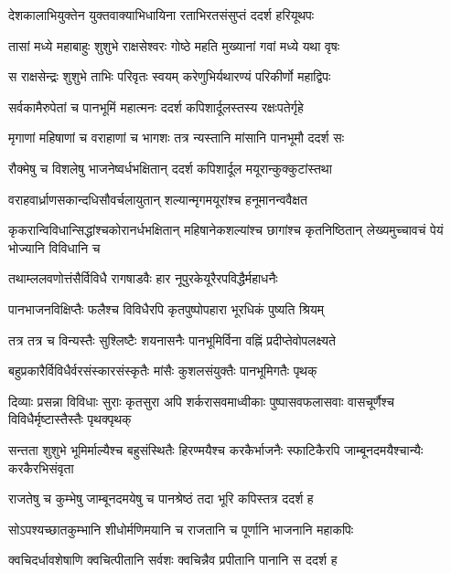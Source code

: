 \twolineshloka
{देशकालाभियुक्तेन युक्तवाक्याभिधायिना}
{रताभिरतसंसुप्तं ददर्श हरियूथपः} %

\twolineshloka
{तासां मध्ये महाबाहुः शुशुभे राक्षसेश्वरः}
{गोष्ठे महति मुख्यानां गवां मध्ये यथा वृषः} %

\twolineshloka
{स राक्षसेन्द्रः शुशुभे ताभिः परिवृतः स्वयम्}
{करेणुभिर्यथारण्यं परिकीर्णो महाद्विपः} %

\twolineshloka
{सर्वकामैरुपेतां च पानभूमिं महात्मनः}
{ददर्श कपिशार्दूलस्तस्य रक्षःपतेर्गृहे} %

\twolineshloka
{मृगाणां महिषाणां च वराहाणां च भागशः}
{तत्र न्यस्तानि मांसानि पानभूमौ ददर्श सः} %

\twolineshloka
{रौक्मेषु च विशलेषु भाजनेष्वर्धभक्षितान्}
{ददर्श कपिशार्दूल मयूरान्कुक्कुटांस्तथा} %

\twolineshloka
{वराहवार्ध्राणसकान्दधिसौवर्चलायुतान्}
{शल्यान्मृगमयूरांश्च हनूमानन्ववैक्षत} %

\threelineshloka
{कृकरान्विविधान्सिद्धांश्चकोरानर्धभक्षितान्}
{महिषानेकशल्यांश्च छागांश्च कृतनिष्ठितान्}
{लेख्यमुच्चावचं पेयं भोज्यानि विविधानि च} %

\twolineshloka
{तथाम्ललवणोत्तंसैर्विविधै रागषाडवैः}
{हार नूपुरकेयूरैरपविद्धैर्महाधनैः} %

\twolineshloka
{पानभाजनविक्षिप्तैः फलैश्च विविधैरपि}
{कृतपुष्पोपहारा भूरधिकं पुष्यति श्रियम्} %

\twolineshloka
{तत्र तत्र च विन्यस्तैः सुश्लिष्टैः शयनासनैः}
{पानभूमिर्विना वह्निं प्रदीप्तेवोपलक्ष्यते} %

\twolineshloka
{बहुप्रकारैर्विविधैर्वरसंस्कारसंस्कृतैः}
{मांसैः कुशलसंयुक्तैः पानभूमिगतैः पृथक्} %

\threelineshloka
{दिव्याः प्रसन्ना विविधाः सुराः कृतसुरा अपि}
{शर्करासवमाध्वीकाः पुष्पासवफलासवाः}
{वासचूर्णैश्च विविधैर्मृष्टास्तैस्तैः पृथक्पृथक्} %

\threelineshloka
{सन्तता शुशुभे भूमिर्माल्यैश्च बहुसंस्थितैः}
{हिरण्मयैश्च करकैर्भाजनैः स्फाटिकैरपि}
{जाम्बूनदमयैश्चान्यैः करकैरभिसंवृता} %

\twolineshloka
{राजतेषु च कुम्भेषु जाम्बूनदमयेषु च}
{पानश्रेष्ठं तदा भूरि कपिस्तत्र ददर्श ह} %

\twolineshloka
{सोऽपश्यच्छातकुम्भानि शीधोर्मणिमयानि च}
{राजतानि च पूर्णानि भाजनानि महाकपिः} %

\twolineshloka
{क्वचिदर्धावशेषाणि क्वचित्पीतानि सर्वशः}
{क्वचिन्नैव प्रपीतानि पानानि स ददर्श ह} %

